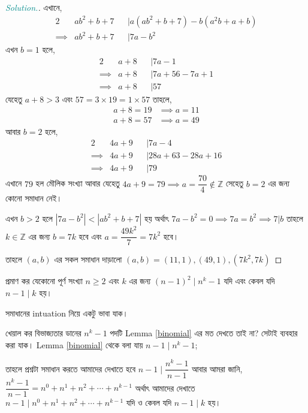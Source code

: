 \documentclass[a4paper,11pt]{article}
\newenvironment{sltn}{\begin{proof}[\emph{\textcolor{darkcyan}{Solution.}}]} {\end{proof}}
\begin{document}
\begin{sltn}
	এখানে, 
	\begin{alignat*}{2}
		         & ab^2+b+7 &  & | a(ab^2+b+7)-b(a^2b+a+b) \\
		\implies & ab^2+b+7 &  & | 7a-b^2
	\end{alignat*}
	এখন $b=1$ হলে, 
	\begin{alignat*}{2}
		         & a+8 &  & | 7a-1       \\
		\implies & a+8 &  & | 7a+56-7a+1 \\
		\implies & a+8 &  & | 57
	\end{alignat*}
	যেহেতু $a+8>3$ এবং $57=3\times 19=1\times 57$ তাহলে,
	\begin{align*}
		a+8=19 & \implies a=11 \\
		a+8=57 & \implies a=49
	\end{align*}
	আবার $b=2$ হলে,
	\begin{alignat*}{2}
		         & 4a+9 &  & | 7a-4          \\
		\implies & 4a+9 &  & | 28a+63-28a+16 \\
		\implies & 4a+9 &  & | 79
	\end{alignat*}
	এখানে $79$ হল মৌলিক সংখ্যা আবার যেহেতু $4a+9=79\implies a=\dfrac{70}{4} \not \in \mathbb{Z}$ সেহেতু $b=2$ এর জন্য কোনো সমাধান নেই। 
	
	এখন $b>2$ হলে $|7a-b^2|<|ab^2+b+7|$ হয় অর্থাৎ $7a-b^2=0\implies 7a=b^2 \implies 7|b$ তাহলে $k \in \mathbb{Z}$ এর জন্য $b=7k$ হবে এবং $a=\dfrac{49k^2}{7}=7k^2$ হবে।
	
	তাহলে $(a,b)$ এর সকল সমাধান দাড়ালো $(a,b)=(11,1),(49,1),(7k^2,7k)$
\end{sltn}
\begin{xmpl}
	প্রমাণ কর যেকোনো পূর্ণ সংখ্যা $n \geq 2$ এবং $k$ এর জন্য $(n-1)^2 \mid n^k-1$ যদি এবং কেবল যদি $n-1 \mid k$ হয়। 
\end{xmpl}
সমাধানের intuation নিয়ে একটু ভাবা যাক। 

খেয়াল কর বিভাজ্যতার ডানের $n^k-1$ পদটি Lemma \ref{binomial} এর মত দেখতে তাই না? সেটাই ব্যবহার করা যাক। Lemma \ref{binomial} থেকে বলা যায় $n-1 \mid n^k-1$; 

তাহলে প্রশ্নটা সমাধান করতে আমাদের দেখাতে হবে $n-1 \mid \dfrac{n^k-1}{n-1}$ আবার আমরা জানি, $\dfrac{n^k-1}{n-1}=n^0+n^1+n^2+\cdots+n^{k-1}$ অর্থাৎ আমাদের দেখাতে $n-1 \mid n^0+n^1+n^2+\cdots+n^{k-1}$ যদি ও কেবল যদি $n-1\mid k$ হয়। 
\end{document}
